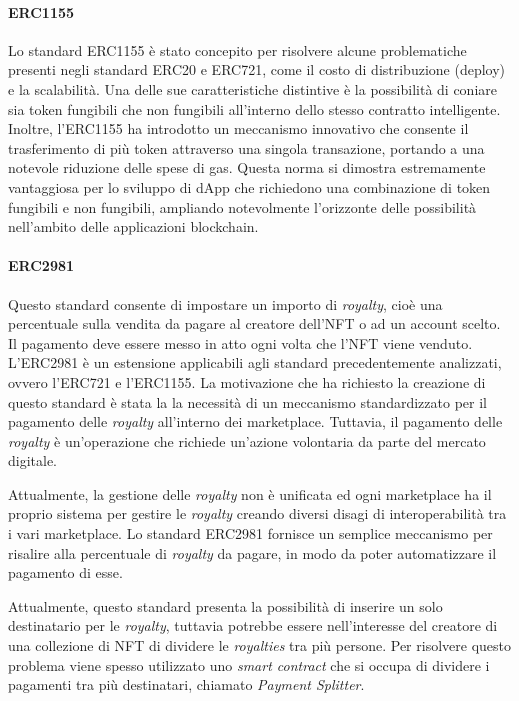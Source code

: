 \paragraph{ERC1155}
\label{sec:erc1155}

Lo standard ERC1155 è stato concepito per risolvere alcune problematiche presenti negli standard ERC20 e ERC721, come il costo di distribuzione (deploy) e la scalabilità. Una delle sue caratteristiche distintive è la possibilità di coniare sia token fungibili che non fungibili all'interno dello stesso contratto intelligente. Inoltre, l'ERC1155 ha introdotto un meccanismo innovativo che consente il trasferimento di più token attraverso una singola transazione, portando a una notevole riduzione delle spese di gas. Questa norma si dimostra estremamente vantaggiosa per lo sviluppo di dApp che richiedono una combinazione di token fungibili e non fungibili, ampliando notevolmente l'orizzonte delle possibilità nell'ambito delle applicazioni blockchain. \cite{erc1155}

\paragraph{ERC2981}
\label{sec:erc2981}
Questo standard consente di impostare un importo di \textit{royalty}, cioè una percentuale sulla vendita da pagare al creatore dell'NFT o ad un account scelto. Il pagamento deve essere messo in atto ogni volta che l'NFT viene venduto. L'ERC2981 è un estensione applicabili agli standard precedentemente analizzati, ovvero l'ERC721 e l'ERC1155. La motivazione che ha richiesto la creazione di questo standard è stata la la necessità di un meccanismo standardizzato per il pagamento delle \textit{royalty} all'interno dei marketplace. Tuttavia, il pagamento delle \textit{royalty} è un'operazione che richiede un'azione volontaria da parte del mercato digitale. 

Attualmente, la gestione delle \textit{royalty} non è unificata ed ogni marketplace ha il proprio sistema per gestire le \textit{royalty} creando diversi disagi di interoperabilità tra i vari marketplace. Lo standard ERC2981 fornisce un semplice meccanismo per risalire alla percentuale di \textit{royalty} da pagare, in modo da poter automatizzare il pagamento di esse. \cite{erc2981}

Attualmente, questo standard presenta la possibilità di inserire un solo destinatario per le \textit{royalty}, tuttavia potrebbe essere nell'interesse del creatore di una collezione di NFT di dividere le \textit{royalties} tra più persone. Per risolvere questo problema viene spesso utilizzato uno \textit{smart contract} che si occupa di dividere i pagamenti tra più destinatari, chiamato \textit{Payment Splitter}. \cite{payment-splitter}

\newpage